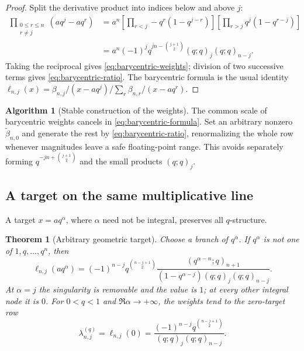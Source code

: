 \documentclass[11pt,a4paper,oneside]{article}
\newtheorem{theorem}{Theorem}[section]
\theoremstyle{definition}
\newtheorem{algorithm}[algorithm]{Algorithm}
\theoremstyle{remark}
\begin{document}
\begin{proof}
Split the derivative product into indices below and above $j$:
\begin{align*}
 \prod_{\substack{0\le r\le n\\r\ne j}}(aq^j-aq^r)
 &=a^n
 \left[\prod_{r<j}-q^r(1-q^{j-r})\right]
 \left[\prod_{r>j}q^j(1-q^{r-j})\right]\\
 &=a^n(-1)^jq^{jn-\binom{j+1}{2}}
   (q;q)_j(q;q)_{n-j}.
\end{align*}
Taking the reciprocal gives \eqref{eq:barycentric-weights}; division of two
successive terms gives \eqref{eq:barycentric-ratio}.  The barycentric formula
is the usual identity
$\ell_{n,j}(x)=\beta_{n,j}/(x-aq^j)\big/\sum_r\beta_{n,r}/(x-aq^r)$.
\end{proof}

\begin{algorithm}[Stable construction of the weights]
The common scale of barycentric weights cancels in
\eqref{eq:barycentric-formula}.  Set an arbitrary nonzero
$\widetilde\beta_{n,0}$ and generate the rest by
\eqref{eq:barycentric-ratio}, renormalizing the whole row whenever magnitudes
leave a safe floating-point range.  This avoids separately forming
$q^{-jn+\binom{j+1}{2}}$ and the small products $(q;q)_j$.
\end{algorithm}

\subsection{A target on the same multiplicative line}

A target $x=aq^\alpha$, where $\alpha$ need not be integral, preserves all
$q$-structure.

\begin{theorem}[Arbitrary geometric target]
\label{thm:general-target}
Choose a branch of $q^\alpha$.  If $q^\alpha$ is not one of
$1,q,\ldots,q^n$, then
\begin{equation}
 \ell_{n,j}(aq^\alpha)
 =(-1)^{n-j}q^{\binom{n-j+1}{2}}
 \frac{(q^{\alpha-n};q)_{n+1}}
 {(1-q^{\alpha-j})(q;q)_j(q;q)_{n-j}}.
 \label{eq:general-target-cardinal}
\end{equation}
At $\alpha=j$ the singularity is removable and the value is $1$; at every
other integral node it is $0$.  For $0<q<1$ and
$\Re\alpha\to+\infty$, the weights tend to the zero-target row
\begin{equation}
 \lambda_{n,j}^{(q)}
 =\ell_{n,j}(0)
 =\frac{(-1)^{n-j}q^{\binom{n-j+1}{2}}}
 {(q;q)_j(q;q)_{n-j}}.
 \label{eq:zero-target-row}
\end{equation}
\end{theorem}
\end{document}
